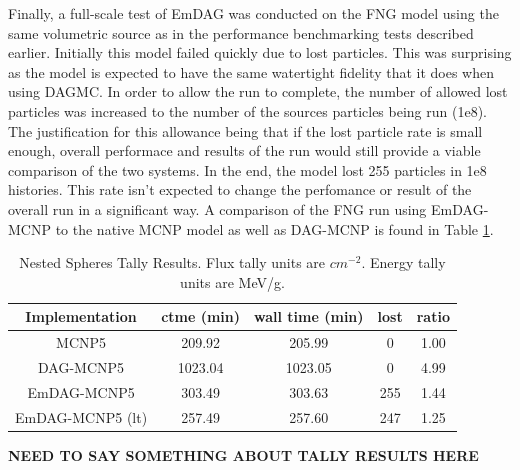 \documentclass[10pt, a4paper]{article}
\begin{document}
Finally, a full-scale test of EmDAG was conducted on the FNG model using the same volumetric source as in the performance benchmarking tests described earlier. Initially this model failed quickly due to lost particles. This was surprising as the model is expected to have the same watertight fidelity that it does when using DAGMC. In order to allow the run to complete, the number of allowed lost particles was increased to the number of the sources particles being run (1e8). The justification for this allowance being that if the lost particle rate is small enough, overall performace and results of the run would still provide a viable comparison of the two systems. In the end, the model lost 255 particles in 1e8 histories. This rate isn't expected to change the perfomance or result of the overall run in a significant way. A comparison of the FNG run using EmDAG-MCNP to the native MCNP model as well as DAG-MCNP is found in Table \ref{fngemdag}.


\begin{table}[H]
  \small
  \begin{center}
    \caption{Nested Spheres Tally Results. Flux tally units are $cm^{-2}$. Energy tally units are MeV/g.}
    \label{fngemdag}
        \begin{tabular}{|c|c|c|c|c|}
      \hline
      \textbf{Implementation} & \textbf{ctme (min)} & \textbf{wall time (min)} & \textbf{lost} & \textbf{ratio} \\
      \hline
      MCNP5 & 209.92 & 205.99 & 0 & 1.00 \\
      \hline
      DAG-MCNP5 & 1023.04 & 1023.05 & 0 & 4.99 \\
      \hline
      EmDAG-MCNP5 & 303.49 & 303.63 & 255 & 1.44 \\
      \hline
      EmDAG-MCNP5 (lt) & 257.49 & 257.60 & 247 & 1.25 \\
      \hline
    \end{tabular} 

  \end{center}
\end{table}

\textbf{NEED TO SAY SOMETHING ABOUT TALLY RESULTS HERE}
\end{document}
